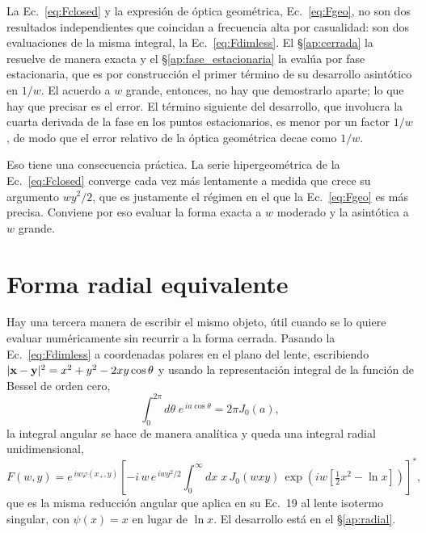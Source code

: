 \documentclass[11pt,a4paper,openany]{book}
\begin{document}
La Ec.~\eqref{eq:Fclosed} y la expresi\'on de \'optica geom\'etrica,
Ec.~\eqref{eq:Fgeo}, no son dos resultados independientes que coincidan a
frecuencia alta por casualidad: son dos evaluaciones de la misma integral, la
Ec.~\eqref{eq:Fdimless}. El \S\ref{ap:cerrada} la resuelve de manera exacta y
el \S\ref{ap:fase_estacionaria} la eval\'ua por fase estacionaria, que es por
construcci\'on el primer t\'ermino de su desarrollo asint\'otico en $1/w$. El
acuerdo a $w$ grande, entonces, no hay que demostrarlo aparte; lo que hay que
precisar es el error. El t\'ermino siguiente del desarrollo, que involucra la
cuarta derivada de la fase en los puntos estacionarios, es menor por un factor
$1/w$, de modo que el error relativo de la \'optica geom\'etrica decae como
$1/w$.

Eso tiene una consecuencia pr\'actica. La serie hipergeom\'etrica de la
Ec.~\eqref{eq:Fclosed} converge cada vez m\'as lentamente a medida que crece
su argumento $wy^{2}/2$, que es justamente el r\'egimen en el que la
Ec.~\eqref{eq:Fgeo} es m\'as precisa. Conviene por eso evaluar la forma exacta
a $w$ moderado y la asint\'otica a $w$ grande.

\section{Forma radial equivalente}
\label{sec:radial}

Hay una tercera manera de escribir el mismo objeto, \'util cuando se lo quiere
evaluar num\'ericamente sin recurrir a la forma cerrada. Pasando la
Ec.~\eqref{eq:Fdimless} a coordenadas polares en el plano del lente,
escribiendo $|\vb x-\vb y|^{2}=x^{2}+y^{2}-2xy\cos\theta$ y usando la
representaci\'on integral de la funci\'on de Bessel de orden cero,
\begin{equation}
  \int_0^{2\pi}\!d\theta\;e^{\,ia\cos\theta}=2\pi J_0(a) ,
  \label{eq:bessel_identity}
\end{equation}
la integral angular se hace de manera anal\'itica y queda una integral radial
unidimensional,
\begin{equation}
  F(w,y)=e^{\,iw\varphi(x_+,y)}
  \left[-i\,w\,e^{\,iwy^{2}/2}
  \int_0^{\infty}\!dx\;x\,J_0(wxy)\,
  \exp\!\left(i w\left[\tfrac12x^{2}-\ln x\right]\right)\right]^{\!*} ,
  \label{eq:Fradial}
\end{equation}
que es la misma reducci\'on angular que \citet{Takahashi2003} aplica en su
Ec.~19 al lente isotermo singular, con $\psi(x)=x$ en lugar de $\ln x$. El
desarrollo est\'a en el \S\ref{ap:radial}.
\end{document}
